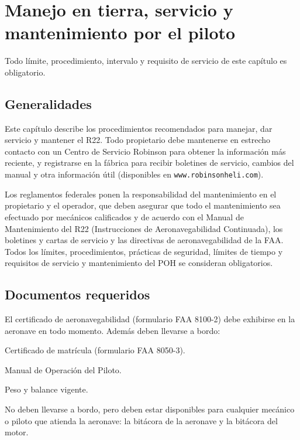 \chapter{Manejo en tierra, servicio y mantenimiento por el piloto}
\label{cap:manejo}

\opening{Todo límite, procedimiento, intervalo y requisito de servicio de este capítulo es obligatorio.}

\section{Generalidades}

Este capítulo describe los procedimientos recomendados para manejar, dar servicio y mantener el R22. Todo propietario debe mantenerse en estrecho contacto con un Centro de Servicio Robinson para obtener la información más reciente, y registrarse en la fábrica para recibir boletines de servicio, cambios del manual y otra información útil (disponibles en \texttt{www.robinsonheli.com}).

Los reglamentos federales ponen la responsabilidad del mantenimiento en el propietario y el operador, que deben asegurar que todo el mantenimiento sea efectuado por mecánicos calificados y de acuerdo con el Manual de Mantenimiento del R22 (Instrucciones de Aeronavegabilidad Continuada), los boletines y cartas de servicio y las directivas de aeronavegabilidad de la FAA. Todos los límites, procedimientos, prácticas de seguridad, límites de tiempo y requisitos de servicio y mantenimiento del POH se consideran obligatorios.

\section{Documentos requeridos}

El certificado de aeronavegabilidad (formulario FAA 8100-2) debe exhibirse en la aeronave en todo momento. Además deben llevarse a bordo:

\begin{pasos}
\item Certificado de matrícula (formulario FAA 8050-3).
\item Manual de Operación del Piloto.
\item Peso y balance vigente.
\end{pasos}

No deben llevarse a bordo, pero deben estar disponibles para cualquier mecánico o piloto que atienda la aeronave: la bitácora de la aeronave y la bitácora del motor.

